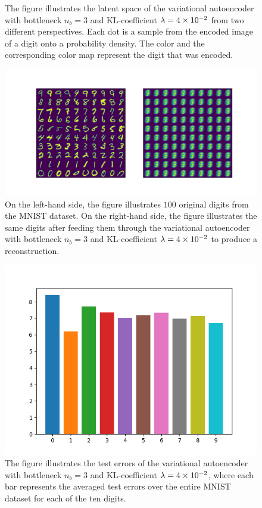 \begin{figure}
\begin{center}
\begin{minipage}[b]{0.49\linewidth}
	\end{minipage}
\end{center}
\caption{The figure illustrates the latent space of the variational autoencoder with bottleneck $n_b=3$ and KL-coefficient $\lambda = \num{4e-2}$ from two different perspectives. Each dot is a sample from the encoded image of a digit onto a probability density. The color and the corresponding color map represent the digit that was encoded.}\label{fig:convolutional_VAE_snd_KL_4e-2_10k_epochs_3D_latent}
\end{figure}


\begin{figure}
\begin{center}
      \includegraphics[trim = 15mm 10mm 15mm 15mm, clip, width=\linewidth]{convolutional_VAE_snd_KL_4e-2_10k_epochs_3D_inference}
\end{center}
\caption{On the left-hand side, the figure illustrates $100$ original digits from the MNIST dataset. On the right-hand side, the figure illustrates the same digits after feeding them through the variational autoencoder with bottleneck $n_b=3$ and KL-coefficient $\lambda=\num{4e-2}$ to produce a reconstruction.}\label{fig:convolutional_VAE_snd_KL_4e-2_10k_epochs_3D_inference}
\end{figure}


\begin{figure}
\begin{center}
      \includegraphics[width=0.55\linewidth]{convolutional_VAE_snd_KL_4e-2_10k_epochs_3D_errors}
\end{center}
\caption{The figure illustrates the test errors of the variational autoencoder with bottleneck $n_b=3$ and KL-coefficient $\lambda = \num{4e-2}$, where each bar represents the averaged test errors over the entire MNIST dataset for each of the ten digits.}\label{fig:convolutional_VAE_snd_KL_4e-2_10k_epochs_3D_errors}
\end{figure}



